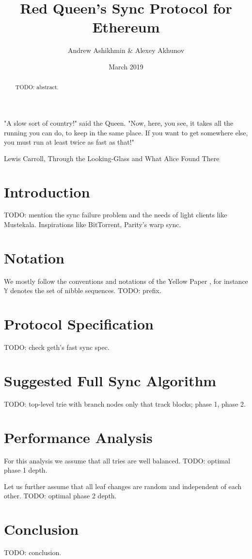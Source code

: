 \documentclass{amsart}
\begin{document}
\title{Red Queen's Sync Protocol for Ethereum}
\author{Andrew Ashikhmin \& Alexey Akhunov}
\date{March 2019}

\begin{abstract}
TODO: abstract.
\end{abstract}

\maketitle

\epigraph{
    "A slow sort of country!" said the Queen.
    "Now, here, you see, it takes all the running you can do, to keep in the same place.
    If you want to get somewhere else, you must run at least twice as fast as that!"
    }{Lewis Carroll, Through the Looking-Glass and What Alice Found There}

\section{Introduction}
TODO: mention the sync failure problem \cite{akhunov_1x_workshop_part1} and the needs of light clients like Mustekala.
Inspirations like BitTorrent, Parity's warp sync.

\section{Notation}
We mostly follow the conventions and notations of the Yellow Paper \cite{yellow_paper},
for instance $\mathbb{Y}$ denotes the set of nibble sequences.
TODO: prefix.

\section{Protocol Specification}
TODO: check geth's fast sync spec.

\section{Suggested Full Sync Algorithm}
TODO: top-level trie with branch nodes only that track blocks; phase 1, phase 2.

\section{Performance Analysis}
For this analysis we assume that all tries are well balanced.
TODO: optimal phase 1 depth.

Let us further assume that all leaf changes are random and independent of each other.
TODO: optimal phase 2 depth.

\section{Conclusion}
TODO: conclusion.



\end{document}
